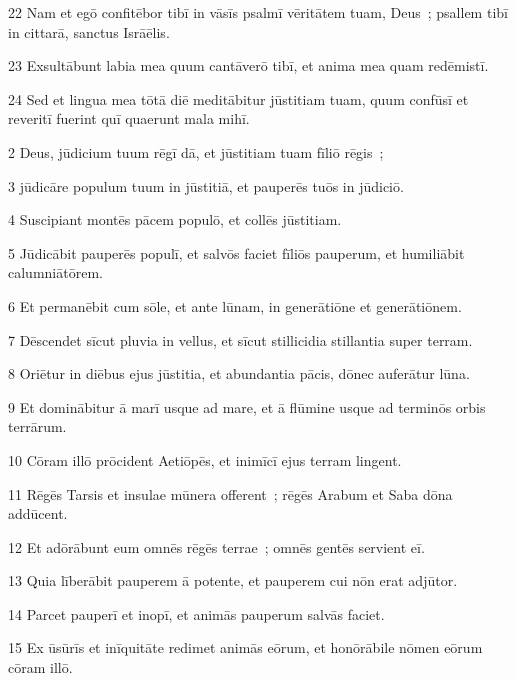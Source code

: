 \psalmVerse
  {\phantom{0}22}
  {Nam et egō confitēbor tibī in vāsīs psalmī vēritātem tuam, Deus~; psallem tibī in cittarā, sanctus Isrāēlis.}


\psalmVerse
  {\phantom{0}23}
  {Exsultābunt labia mea quum cantāverō tibī, et anima mea quam redēmistī.}


\psalmVerse
  {\phantom{0}24}
  {Sed et lingua mea tōtā diē meditābitur jūstitiam tuam, quum confūsī et reveritī fuerint quī quaerunt mala mihī.}



\psalmVerse
  {\phantom{00}2}
  {Deus, jūdicium tuum rēgī dā, et jūstitiam tuam fīliō rēgis~;}


\psalmVerse
  {\phantom{00}3}
  {jūdicāre populum tuum in jūstitiā, et pauperēs tuōs in jūdiciō.}


\psalmVerse
  {\phantom{00}4}
  {Suscipiant montēs pācem populō, et collēs jūstitiam.}


\psalmVerse
  {\phantom{00}5}
  {Jūdicābit pauperēs populī, et salvōs faciet fīliōs pauperum, et humiliābit calumniātōrem.}


\psalmVerse
  {\phantom{00}6}
  {Et permanēbit cum sōle, et ante lūnam, in generātiōne et generātiōnem.}


\psalmVerse
  {\phantom{00}7}
  {Dēscendet sīcut pluvia in vellus, et sīcut stillicidia stillantia super terram.}


\psalmVerse
  {\phantom{00}8}
  {Oriētur in diēbus ejus jūstitia, et abundantia pācis, dōnec auferātur lūna.}


\psalmVerse
  {\phantom{00}9}
  {Et dominābitur ā marī usque ad mare, et ā flūmine usque ad terminōs orbis terrārum.}


\psalmVerse
  {\phantom{0}10}
  {Cōram illō prōcident Aetiōpēs, et inimīcī ejus terram lingent.}


\psalmVerse
  {\phantom{0}11}
  {Rēgēs Tarsis et insulae mūnera offerent~; rēgēs Arabum et Saba dōna addūcent.}


\psalmVerse
  {\phantom{0}12}
  {Et adōrābunt eum omnēs rēgēs terrae~; omnēs gentēs servient eī.}


\psalmVerse
  {\phantom{0}13}
  {Quia līberābit pauperem ā potente, et pauperem cui nōn erat adjūtor.}


\psalmVerse
  {\phantom{0}14}
  {Parcet pauperī et inopī, et animās pauperum salvās faciet.}


\psalmVerse
  {\phantom{0}15}
  {Ex ūsūrīs et inīquitāte redimet animās eōrum, et honōrābile nōmen eōrum cōram illō.}


